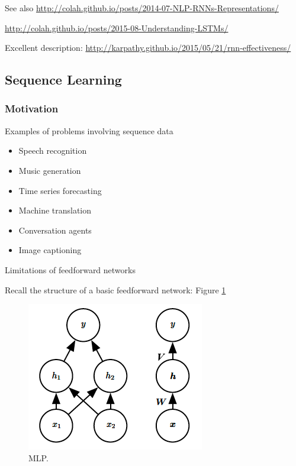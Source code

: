 \documentclass[english]{article}
\begin{document}
\item See also \url{http://colah.github.io/posts/2014-07-NLP-RNNs-Representations/}

\url{http://colah.github.io/posts/2015-08-Understanding-LSTMs/}

Excellent description: \url{http://karpathy.github.io/2015/05/21/rnn-effectiveness/}

\eenum 

\subsection{Sequence Learning}

\subsubsection{Motivation} %
\benum
\item 
 {Examples of problems involving sequence data}
\begin{itemize}
\item Speech recognition
\item Music generation
\item Time series forecasting
\item Machine translation
\item Conversation agents
\item Image captioning
\end{itemize}
 

\item 
 {Limitations of feedforward networks}

Recall the structure of a basic feedforward network:  Figure \ref{MLP}
\begin{figure}
  \centering
\includegraphics[width=0.4\linewidth]{mlp.png}
    \caption{MLP.}
    \label{MLP}
\end{figure}
\end{document}
